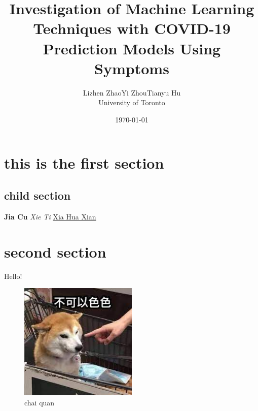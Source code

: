 \documentclass{article}
\title{Investigation of Machine Learning Techniques with COVID-19 Prediction Models Using Symptoms}
\author{Lizhen Zhao\qquad Yi Zhou\qquad Tianyu Hu\\{University of Toronto}}
\date{\today}
\begin{document}
	\maketitle

	\section{this is the first section}
	\subsection{child section}
	\textbf{Jia Cu}
	\textit{Xie Ti}
	\underline{Xia Hua Xian}

	\section{second section}
	Hello!

	\begin{figure}
		\centering
		\includegraphics[width=0.5\textwidth]{image}
		\caption{chai quan}
	\end{figure}
\end{document}

